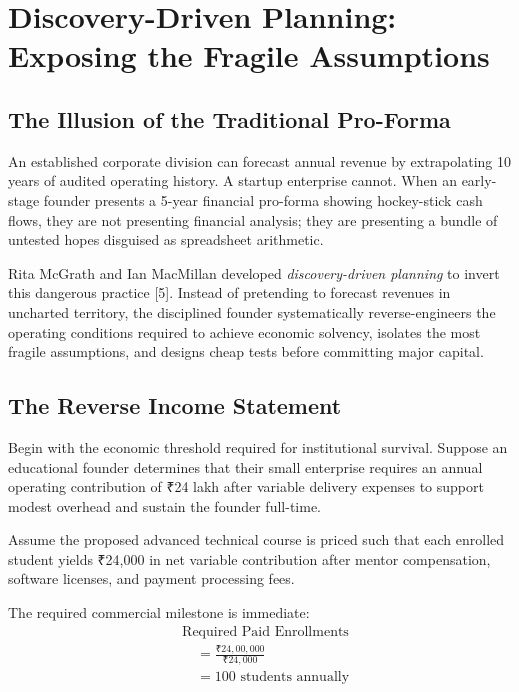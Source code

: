 \section{Discovery-Driven Planning: Exposing the Fragile Assumptions}

\subsection{The Illusion of the Traditional Pro-Forma}

An established corporate division can forecast annual revenue by extrapolating 10 years of audited operating history. A startup enterprise cannot. When an early-stage founder presents a 5-year financial pro-forma showing hockey-stick cash flows, they are not presenting financial analysis; they are presenting a bundle of untested hopes disguised as spreadsheet arithmetic.

Rita McGrath and Ian MacMillan developed \textit{discovery-driven planning} to invert this dangerous practice [5]. Instead of pretending to forecast revenues in uncharted territory, the disciplined founder systematically reverse-engineers the operating conditions required to achieve economic solvency, isolates the most fragile assumptions, and designs cheap tests before committing major capital.

\subsection{The Reverse Income Statement}

Begin with the economic threshold required for institutional survival. Suppose an educational founder determines that their small enterprise requires an annual operating contribution of ₹24 lakh after variable delivery expenses to support modest overhead and sustain the founder full-time.

Assume the proposed advanced technical course is priced such that each enrolled student yields ₹24,000 in net variable contribution after mentor compensation, software licenses, and payment processing fees.

The required commercial milestone is immediate:
\begin{equation}
\begin{aligned}
&\text{Required Paid Enrollments} \\
&\quad = \frac{\text{₹}24,00,000}{\text{₹}24,000} \\
&\quad = 100 \text{ students annually}
\end{aligned}
\end{equation}

